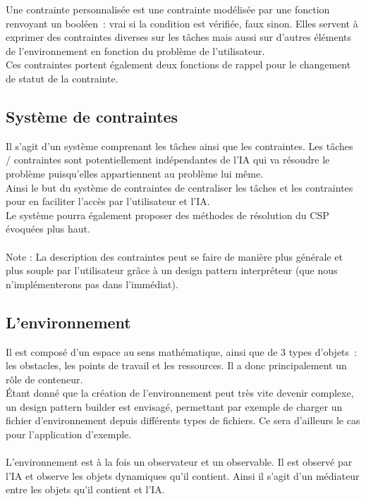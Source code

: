 Une contrainte personnalisée est une contrainte modélisée par une fonction renvoyant un booléen~: vrai si la condition est vérifiée, faux sinon.
Elles servent à exprimer des contraintes diverses sur les tâches mais aussi sur d'autres éléments de l'environnement en fonction du problème de l'utilisateur.\\

Ces contraintes portent également deux fonctions de rappel pour le changement de statut de la contrainte.

\subsection{Système de contraintes}
Il s'agit d'un système comprenant les tâches ainsi que les contraintes. Les  tâches / contraintes sont potentiellement indépendantes de l'IA qui va résoudre le problème puisqu'elles appartiennent au problème lui même.\\

Ainsi le but du système de contraintes de centraliser les tâches et les contraintes pour en faciliter l'accès par l'utilisateur et l'IA.\\
\indent Le système pourra également proposer des méthodes de résolution du CSP évoquées plus haut.\\\\

Note : La description des contraintes peut se faire de manière plus générale et plus souple par l'utilisateur grâce à un design pattern interpréteur (que nous n'implémenterons pas dans l'immédiat).


\subsection{L'environnement}

Il est composé d'un espace au sens mathématique, ainsi que de 3 types d'objets~: les obstacles, les points de travail et les ressources. Il a donc principalement un rôle de conteneur.\\

\'Etant donné que la création de l'environnement peut très vite devenir complexe, un design pattern builder est envisagé, permettant par exemple de charger un fichier d'environnement depuis différents types de fichiers.
Ce sera d'ailleurs le cas pour l'application d'exemple.\\\\

L'environnement est à la fois un observateur et un observable. Il est observé par l'IA et observe les objets dynamiques qu'il contient. Ainsi il s'agit d'un médiateur entre les objets qu'il contient et l'IA.

